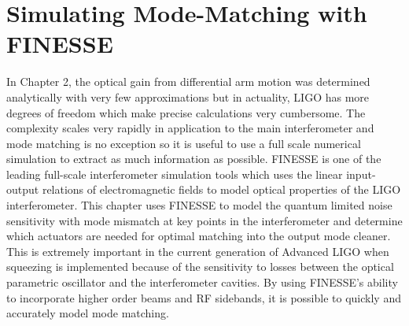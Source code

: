 \chapter{Simulating Mode-Matching with FINESSE}
In Chapter 2, the optical gain from differential arm motion was determined analytically with very few approximations but in actuality, LIGO has more degrees of freedom which make precise calculations very cumbersome.  The complexity scales very rapidly in application to the main interferometer and mode matching is no exception so it is useful to use a full scale numerical simulation to extract as much information as possible.  FINESSE \cite{FinesseManual} \cite{FinesseTechniques} is one of the leading full-scale interferometer simulation tools which uses the linear input-output relations of electromagnetic fields to model optical properties of the LIGO interferometer.  This chapter uses FINESSE to model the quantum limited noise sensitivity with mode mismatch at key points in the interferometer and determine which actuators are needed for optimal matching into the output mode cleaner.  This is extremely important in the current generation of Advanced LIGO when squeezing is implemented because of the sensitivity to losses between the optical parametric oscillator and the interferometer cavities.  By using FINESSE's ability to incorporate higher order beams and RF sidebands, it is possible to quickly and accurately model mode matching.

